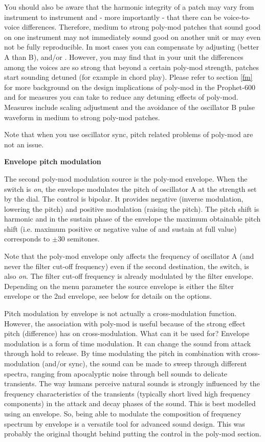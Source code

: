 You should also be aware that the harmonic integrity of a patch may vary from instrument to instrument and - more importantly - that there can be voice-to-voice differences. Therefore, medium to strong poly-mod patches that sound good on one instrument may not immediately sound good on another unit or may even not be fully reproducible. In most cases you can compensate by adjusting \oscfreq (better A than B), \freqfine and/or \polymodosc. However, you may find that in your unit the differences among the voices are so strong that beyond a certain poly-mod strength, patches start sounding detuned (for example in chord play). Please refer to section \ref{fm} for more background on the design implications of poly-mod in the Prophet-600 and for measures you can take to reduce any detuning effects of poly-mod. Measures include scaling adjustment and the avoidance of the oscillator B pulse waveform in medium to strong poly-mod patches. 

Note that when you use oscillator sync, pitch related problems of poly-mod are not an issue.

\textbf{Envelope pitch modulation}

The second poly-mod modulation source is the poly-mod envelope. When the \polymodfreq switch is \textit{on}, the envelope modulates the pitch of oscillator A at the strength set by the \polymodenv dial. The \polymodenv control is bipolar. It  provides negative (inverse modulation, lowering the pitch) and positive modulation (raising the pitch). The pitch shift is harmonic and in the sustain phase of the envelope the maximum obtainable pitch shift (i.e. maximum positive or negative value of \polymodenv and sustain at full value) corresponds to $\pm 30$ semitones.

Note that the poly-mod envelope only affects the frequency of oscillator A (and never the filter cut-off frequency) even if the second destination, the \polymodfilter switch, is also \textit{on}. The filter cut-off frequency is already modulated by the filter envelope. Depending on the menu parameter \envrouting the source envelope is either the filter envelope or the 2nd envelope, see below for details on the options.

Pitch modulation by envelope is not actually a cross-modulation function. However, the association with poly-mod is useful because of the strong effect pitch (difference) has on cross-modulation. What can it be used for? Envelope modulation is a form of time modulation. It can change the sound from attack through hold to release. By time modulating the pitch in combination with cross-modulation (and/or sync), the sound can be made to sweep through different spectra, ranging from apocalyptic noise through bell sounds to delicate transients. The way humans perceive natural sounds is strongly influenced by the frequency characteristics of the transients (typically short lived high frequency components) in the attack and decay phases of the sound. This is best modelled using an envelope. So, being able to modulate the composition of frequency spectrum by envelope is a versatile tool for advanced sound design. This was probably the original thought behind putting the \polymodenv control in the poly-mod section.

